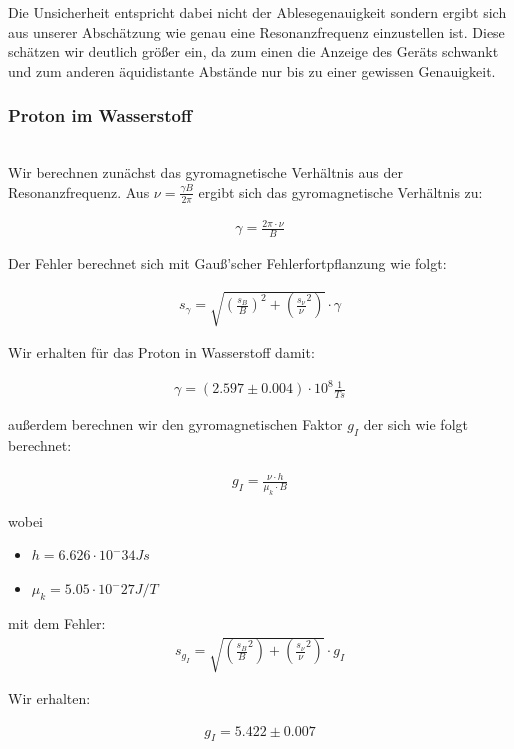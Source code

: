 \documentclass[12pt]{article}
\begin{document}
Die Unsicherheit entspricht dabei nicht der Ablesegenauigkeit sondern ergibt sich aus unserer Abschätzung wie genau eine Resonanzfrequenz einzustellen ist. Diese schätzen wir deutlich größer ein, da zum einen die Anzeige des Geräts schwankt und zum anderen äquidistante Abstände nur bis zu einer gewissen Genauigkeit.
\subsubsection{Proton im Wasserstoff} \label{Rechnung}
\ \\
Wir berechnen zunächst das gyromagnetische Verhältnis aus der Resonanzfrequenz. Aus $\nu=\frac{\gamma B}{2\pi}$ ergibt sich das gyromagnetische Verhältnis zu:

\begin{align*}
\gamma = \frac{2\pi \cdot \nu}{B}
\end{align*}

Der Fehler berechnet sich mit Gauß'scher Fehlerfortpflanzung wie folgt:

\begin{align*}
s_{\gamma} = \sqrt{\left(\frac{s_B}{B}\right)^2+\left(\frac{s_\nu}{\nu}^2 \right)}\cdot \gamma
\end{align*}

Wir erhalten für das Proton in Wasserstoff damit: 

\begin{align*}
\gamma = (2.597\pm 0.004) \cdot 10^8 \frac{1}{Ts}
\end{align*}

außerdem berechnen wir den gyromagnetischen Faktor $g_I$ der sich wie folgt berechnet: 

\begin{align*}
g_I = \frac{\nu \cdot h}{\mu_k \cdot B}
\end{align*}

wobei 
\begin{itemize}
	\item $h =  6.626 \cdot 10^-34 Js$
	\item $\mu_k = 5.05 \cdot 10^-27 J/T$
\end{itemize}

mit dem Fehler:
\begin{align*}
s_{g_I} = \sqrt{\left(\frac{s_B}{B}^2\right)+\left(\frac{s_\nu}{\nu}^2 \right)}\cdot g_I
\end{align*}

Wir erhalten:

\begin{align*}
g_I = 5.422  \pm 0.007
\end{align*}
\end{document}
